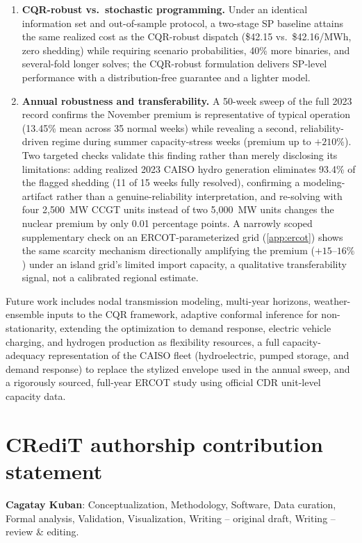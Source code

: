\documentclass[preprint,12pt,authoryear]{elsarticle}
\begin{document}
\begin{enumerate}
    \item \textbf{CQR-robust vs.\ stochastic programming.} Under an identical information set and out-of-sample protocol, a two-stage SP baseline attains the same realized cost as the CQR-robust dispatch (\$42.15 vs.\ \$42.16/MWh, zero shedding) while requiring scenario probabilities, 40\% more binaries, and several-fold longer solves; the CQR-robust formulation delivers SP-level performance with a distribution-free guarantee and a lighter model.

    \item \textbf{Annual robustness and transferability.} A 50-week sweep of the full 2023 record confirms the November premium is representative of typical operation (13.45\% mean across 35 normal weeks) while revealing a second, reliability-driven regime during summer capacity-stress weeks (premium up to $+210\%$). Two targeted checks validate this finding rather than merely disclosing its limitations: adding realized 2023 CAISO hydro generation eliminates 93.4\% of the flagged shedding (11 of 15 weeks fully resolved), confirming a modeling-artifact rather than a genuine-reliability interpretation, and re-solving with four 2{,}500~MW CCGT units instead of two 5{,}000~MW units changes the nuclear premium by only 0.01 percentage points. A narrowly scoped supplementary check on an ERCOT-parameterized grid (\ref{app:ercot}) shows the same scarcity mechanism directionally amplifying the premium ($+15$--$16\%$) under an island grid's limited import capacity, a qualitative transferability signal, not a calibrated regional estimate.
\end{enumerate}

Future work includes nodal transmission modeling, multi-year horizons, weather-ensemble inputs to the CQR framework, adaptive conformal inference for non-stationarity, extending the optimization to demand response, electric vehicle charging, and hydrogen production as flexibility resources, a full capacity-adequacy representation of the CAISO fleet (hydroelectric, pumped storage, and demand response) to replace the stylized envelope used in the annual sweep, and a rigorously sourced, full-year ERCOT study using official CDR unit-level capacity data.

\section*{CRediT authorship contribution statement}
\textbf{Cagatay Kuban}: Conceptualization, Methodology, Software, Data curation, Formal analysis, Validation, Visualization, Writing -- original draft, Writing -- review \& editing.
\end{document}
